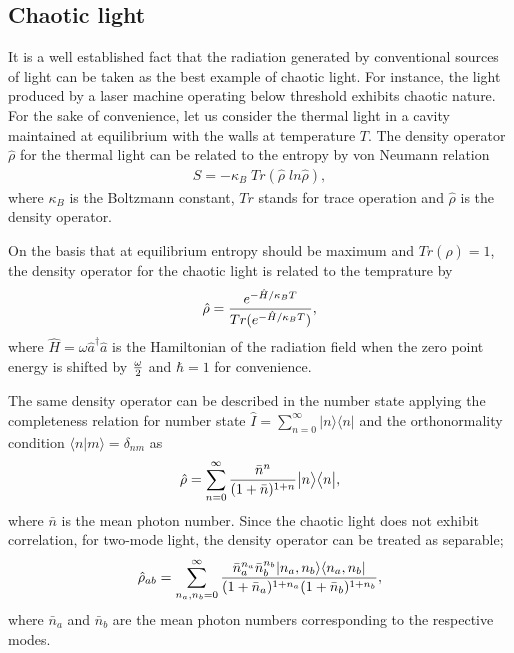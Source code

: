 \documentclass[twocolumn,showpacs,preprintnumbers,amsmath,amssymb,pra]{revtex4}
\begin{document}
\subsection{Chaotic light}

It is a well established fact that the radiation generated by conventional sources of light can be taken as the best example of chaotic light. For instance, the light produced by a laser machine operating below threshold exhibits chaotic nature. For the sake of convenience, let us consider the thermal light in a cavity maintained at equilibrium with the walls  at temperature $T$. The density operator $\hat{\rho}$ for the thermal light can be related to the entropy by von Neumann relation \cite{von}
\begin{align}\label{s01}S=-\kappa_{B} \;Tr(\hat{\rho}\;ln\hat{\rho}),\end{align} where $\kappa_{B}$ is the Boltzmann constant, $Tr$ stands for trace operation and $\hat{\rho}$ is the density operator. 

On the basis  that at equilibrium entropy should be maximum and $Tr(\hat{\rho})=1$, the density operator for the chaotic light is related to the temprature by
\begin{align}\label{s02}\hat{\rho}={e^{-\hat{H}/\kappa_{B} T}\over Tr(e^{-\hat{H}/\kappa_{B} T})},\end{align} where $\hat{H}=\omega\hat{a}^{\dagger}\hat{a}$ is the Hamiltonian of the radiation field when the zero point energy is shifted by ${\omega\over2}$ and $\hbar =1$ for convenience. 

The same density operator can be described in the number state applying the completeness relation for number state $\hat{I}=\sum_{n=0}^{\infty}|n\rangle\langle n|$ and the orthonormality condition $\langle n|m\rangle=\delta_{nm}$ as
\begin{align}\label{s03}\hat{\rho}=\sum_{n=0}^{\infty}{\bar{n}^{n}\over(1+\bar{n})^{1+n}}\big|n\big\rangle\big\langle n\big|,\end{align} where $\bar{n}$ is the mean photon number.
Since the chaotic light does not exhibit correlation, for two-mode light, the density operator  can be treated as separable;
\begin{align}\label{s04}\hat{\rho}_{ab}=\sum_{n_{a},n_{b}=0}^{\infty}{\bar{n}_{a}^{n_{a}}\bar{n}_{b}^{n_{b}}
|n_{a},n_{b}\rangle\langle n_{a},n_{b}|\over(1+\bar{n}_{a})^{1+n_{a}}(1+\bar{n}_{b})^{1+n_{b}}},\end{align} 
where $\bar{n}_{a}$ and $\bar{n}_{b}$ are the mean photon numbers corresponding to the respective modes.
\end{document}
